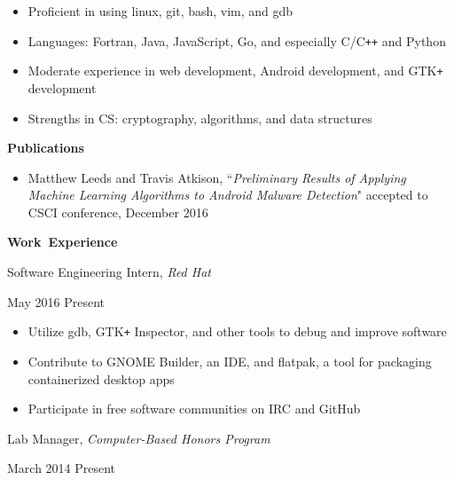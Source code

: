 \documentclass[11pt]{article}
\begin{document}
\begin{itemize}
  \item Proficient in using linux, git, bash, vim, and gdb
  \item Languages: Fortran, Java, JavaScript, Go, and especially C/C\texttt{++} and Python
  \item Moderate experience in web development, Android development, and GTK\texttt{+} development
  \item Strengths in CS: cryptography, algorithms, and data structures
\end{itemize}

\vspace{0.8em}
\hbox{\large \textbf{Publications}}

\vspace{0.4em}
\begin{itemize}[itemindent=0em]
  \item Matthew Leeds and Travis Atkison, ``\textit{Preliminary Results of Applying Machine Learning Algorithms to Android Malware Detection}" accepted to CSCI conference, December 2016
\end{itemize}

\vspace{0.8em}
\hbox{\large \textbf{Work Experience}}

\begin{minipage}[t]{0.65\textwidth}
\flushleft
Software Engineering Intern, \textit{Red Hat}\\
\end{minipage}
\begin{minipage}[t]{0.30\textwidth}
\flushright
May 2016 \space \textemdash \space Present\\
\end{minipage}

\begin{itemize}
  \item Utilize gdb, GTK\texttt{+} Inspector, and other tools to debug and improve software
  \item Contribute to GNOME Builder, an IDE, and flatpak, a tool for packaging containerized desktop apps
  \item Participate in free software communities on IRC and GitHub
\end{itemize}

\begin{minipage}[t]{0.65\textwidth}
\flushleft
Lab Manager, \textit{Computer-Based Honors Program}\\
\end{minipage}
\begin{minipage}[t]{0.30\textwidth}
\flushright
March 2014 \space \textemdash \space Present\\
\end{minipage}
\end{document}

